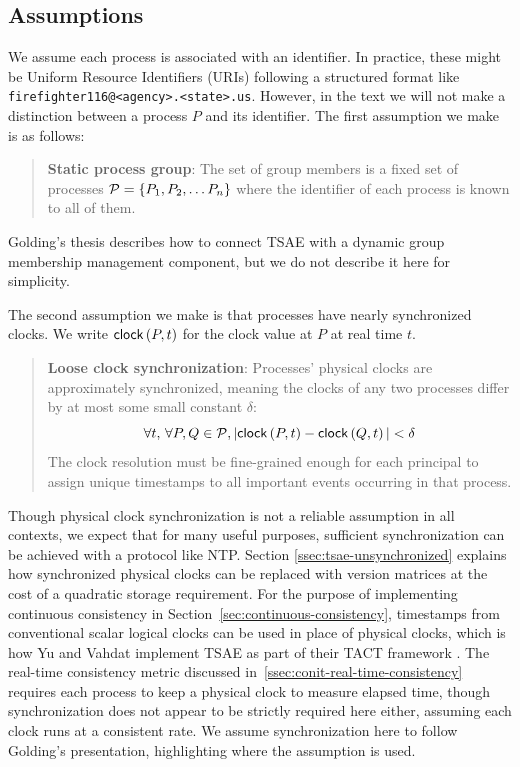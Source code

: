 \documentclass[]             %
{NASA}                       %
\theoremstyle{definition}
\begin{document}
\subsection{Assumptions}
\label{ssec:tsae-assumptions}
We assume each process is associated with an identifier. In practice,
these might be Uniform Resource Identifiers (URIs) \cite{rfc3986}
following a structured format like
\texttt{firefighter116@<agency>.<state>.us}. However, in the text we
will not make a distinction between a process $P$ and its
identifier. The first assumption we make is as follows:
\begin{quote}
  \textbf{Static process group}: The set of group members is a fixed
  set of processes $\mathcal{P} = \{P_1, P_2, \ldots P_n\}$ where the
  identifier of each process is known to all of them.
\end{quote}
Golding's thesis describes how to connect TSAE with a dynamic group
membership management component, but we do not describe it here for
simplicity.

The second assumption we make is that processes have nearly
synchronized clocks. We write $\mathsf{clock}\left(P, t\right)$ for the clock value at $P$
at real time $t$.
\begin{quote}
  \textbf{Loose clock synchronization}: Processes' physical clocks are approximately
  synchronized, meaning the clocks of any two processes differ by at
  most some small constant $\delta$:
  \[ \forall t,\, \forall P, Q \in \mathcal{P}, |\mathsf{clock}\left(P, t\right) - \mathsf{clock}\left(Q, t\right)| < \delta
  \]
  The clock resolution must be fine-grained enough for each principal
  to assign unique timestamps to all important events occurring in
  that process.
\end{quote}

Though physical clock synchronization is not a reliable assumption in
all contexts, we expect that for many useful purposes, sufficient
synchronization can be achieved with a protocol like NTP.  Section
\ref{ssec:tsae-unsynchronized} explains how synchronized physical
clocks can be replaced with version matrices at the cost of a
quadratic storage requirement. For the purpose of implementing
continuous consistency in Section~\ref{sec:continuous-consistency},
timestamps from conventional scalar logical clocks can be used in
place of physical clocks, which is how Yu and Vahdat implement TSAE as
part of their TACT framework \cite{2002tact}. The real-time
consistency metric discussed in~\ref{ssec:conit-real-time-consistency}
requires each process to keep a physical clock to measure elapsed
time, though synchronization does not appear to be strictly required
here either, assuming each clock runs at a consistent rate. We assume
synchronization here to follow Golding's presentation, highlighting
where the assumption is used.
\end{document}
